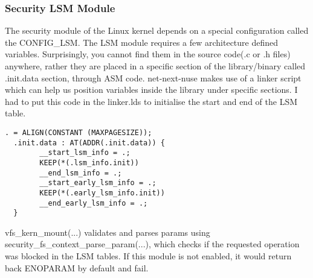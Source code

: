 \documentclass{sig-alternate}
\begin{document}
\subsubsection{Security LSM Module}
The security module of the Linux kernel depends on a special configuration called the CONFIG\_LSM. The LSM module requires a few architecture
defined variables. Surprisingly, you cannot find them in the source code(.c or .h files) anywhere, rather they are placed in a specific section
of the library/binary called .init.data section, through ASM code. net-next-nuse makes use of a linker script which can help us position variables inside
the library under specific sections. I had to put this code in the linker.lds to initialise the start and end of the LSM table.
\begin{lstlisting}[style=CStyle]
  . = ALIGN(CONSTANT (MAXPAGESIZE));
  .init.data : AT(ADDR(.init.data)) {    
		__start_lsm_info = .;	
		KEEP(*(.lsm_info.init))
		__end_lsm_info = .;    
		__start_early_lsm_info = .;	
		KEEP(*(.early_lsm_info.init))
		__end_early_lsm_info = .;
  }
\end{lstlisting}
vfs\_kern\_mount(...) validates and parses params using security\_fs\_context\_parse\_param(...), which checks if the requested operation was blocked
in the LSM tables. If this module is not enabled, it would return back ENOPARAM by default and fail.
\end{document}
